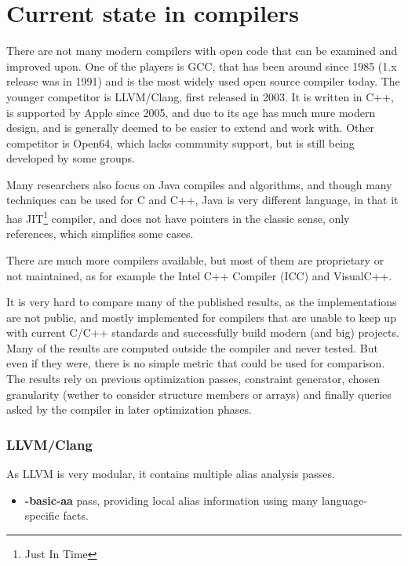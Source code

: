 \section{Current state in compilers}

There are not many modern compilers with open code that can be examined and improved
upon. One of the players is GCC, that has been around since 1985
(1.x release was in 1991) and is the most widely used open source compiler
today. The younger competitor is LLVM/Clang, first released in 2003. It is
written in C++, is supported by Apple since 2005, and due to its age has much
mure modern design, and is generally deemed to be easier to extend and work
with. Other competitor is Open64, which lacks community support, but is still
being developed by some groups.

Many researchers also focus on Java compiles and algorithms, and though many
techniques can be used for C and C++, Java is very different language, in that
it has JIT\footnote{Just In Time} compiler, and does not have pointers in the
classic sense, only references, which simplifies some cases.

There are much more compilers available, but most of them are proprietary or not
maintained, as for example the Intel C++ Compiler (ICC) and VisualC++.

It is very hard to compare many of the published results, as the
implementations are not public, and mostly implemented for compilers that are
unable to keep up with current C/C++ standards and successfully build modern
(and big) projects. Many of the results are computed outside the compiler and
never tested. But even if they were, there is no simple metric that could be
used for comparison. The results rely on previous optimization passes,
constraint generator, chosen granularity (wether to consider structure members or
arrays) and finally queries asked by the compiler in later optimization phases.


\subsubsection{LLVM/Clang}

As LLVM is very modular, it contains multiple alias analysis passes. 

\begin{itemize}
	\item {\bf -basic-aa} pass, providing local alias information using many
		language-specific facts.
\end{itemize}

